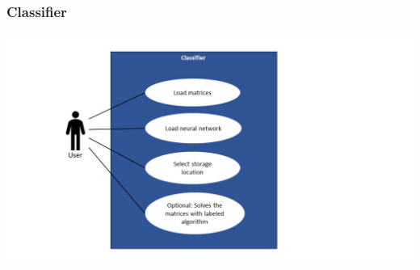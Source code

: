 \documentclass[parskip=full]{scrartcl}
\begin{document}
\subsubsection{Classifier}
\includegraphics[width=1.3\textwidth]{useCase_Classifier}

\clearpage
\end{document}
